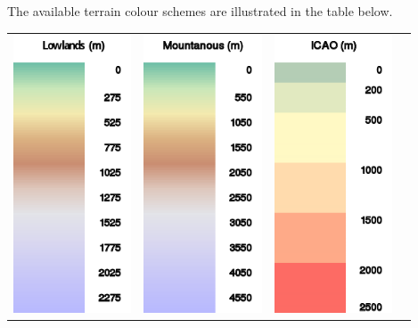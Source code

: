 \begin{maxipage}
The available terrain colour schemes are illustrated in the table below.

\begin{longtable}{c c c c}
\includegraphics[angle=0,width=3.5cm,keepaspectratio='true']{figures/ramp-terrain-flatlands.png}&
\includegraphics[angle=0,width=3.5cm,keepaspectratio='true']{figures/ramp-terrain-mountanous.png}&
\includegraphics[angle=0,width=3.5cm,keepaspectratio='true']{figures/ramp-terrain-icao.png}&

\end{longtable}
\end{maxipage}
